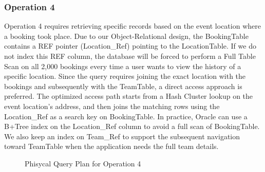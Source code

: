 \documentclass[12pt,a4paper]{article}
\begin{document}
\subsubsection*{Operation 4}

Operation 4 requires retrieving specific records based on the event location where a booking took place. Due to our Object-Relational design, the BookingTable contains a REF pointer (Location\_Ref) pointing to the LocationTable.
If we do not index this REF column, the database will be forced to perform a Full Table Scan on all 2,000 bookings every time a user wants to view the history of a specific location. Since the query requires joining the exact location with the bookings and subsequently with the TeamTable, a direct access approach is preferred.
The optimized access path starts from a Hash Cluster lookup on the event location's address, and then joins the matching rows using the Location\_Ref as a search key on BookingTable. In practice, Oracle can use a B+Tree index on the Location\_Ref column to avoid a full scan of BookingTable. We also keep an index on Team\_Ref to support the subsequent navigation toward TeamTable when the application needs the full team details.

\begin{figure}[h!]
    \centering
    \caption{Phisycal Query Plan for Operation 4}
\end{figure}
\end{document}

